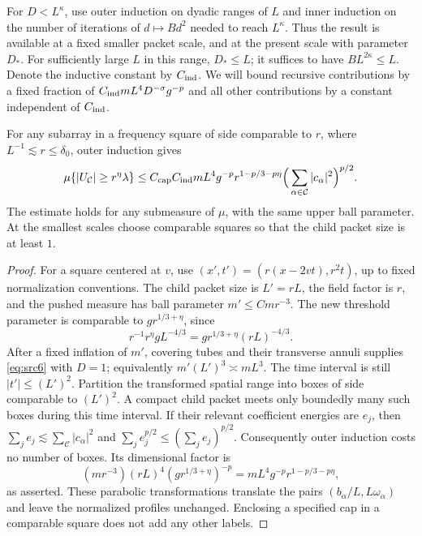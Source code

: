 For $D<L^\kappa$, use outer induction on dyadic ranges of $L$ and inner
induction on the number of iterations of $d\mapsto Bd^2$ needed to reach
$L^\kappa$.  Thus the result is available at a fixed smaller packet
scale, and at the present scale with parameter $D_*$.  For sufficiently
large $L$ in this range, $D_*\leq L$; it suffices to have
$BL^{2\kappa}\leq L$.  Denote the inductive constant by $C_{\rm ind}$.
We will bound recursive contributions by a fixed fraction of
$C_{\rm ind}mL^4D^{-\sigma}g^{-p}$ and all other contributions by a
constant independent of $C_{\rm ind}$.

\begin{lemma}\label{lem:dyadic-cap-gain}
For any subarray in a frequency square of side comparable to $r$, where
$L^{-1}\lesssim r\leq\delta_0$, outer induction gives
\begin{equation}\label{eq:dyadic-cap-gain}
 \mu\{|U_{\mathcal C}|\geq r^\eta\lambda\}
 \leq C_{\rm cap}C_{\rm ind}mL^4g^{-p}
 r^{1-p/3-p\eta}
 \Big(\sum_{\alpha\in\mathcal C}|c_\alpha|^2\Big)^{p/2}.
\end{equation}
The estimate holds for any submeasure of $\mu$, with the same upper ball
parameter.  At the smallest scales choose comparable squares so that
the child packet size is at least $1$.
\end{lemma}
\begin{proof}
For a square centered at $v$, use
$(x',t')=(r(x-2vt),r^2t)$, up to fixed normalization conventions.  The
child packet size is $L'=rL$, the field factor is $r$, and the pushed
measure has ball parameter $m'\leq Cm r^{-3}$.  The new threshold
parameter is comparable to $g r^{1/3+\eta}$, since
\[
 r^{-1}r^\eta gL^{-4/3}
   =g r^{1/3+\eta}(rL)^{-4/3}.
\]
After a fixed inflation of $m'$, covering tubes and their transverse
annuli supplies \eqref{eq:src6} with $D=1$; equivalently
$m'(L')^3\asymp mL^3$.  The time interval is still
$|t'|\leq(L')^2$.  Partition the transformed spatial range into boxes
of side comparable to $(L')^2$.  A compact child packet meets only
boundedly many such boxes during this time interval.  If their relevant
coefficient energies are $e_j$, then
$\sum_j e_j\lesssim\sum_{\mathcal C}|c_\alpha|^2$ and
$\sum_j e_j^{p/2}\leq(\sum_j e_j)^{p/2}$.  Consequently outer induction
costs no number of boxes.  Its dimensional factor is
\[
 (mr^{-3})(rL)^4(g r^{1/3+\eta})^{-p}
  =mL^4g^{-p}r^{1-p/3-p\eta},
\]
as asserted.  These parabolic transformations translate the pairs
$(b_\alpha/L,L\omega_\alpha)$ and leave the normalized profiles
unchanged.  Enclosing a specified cap in a comparable square does not
add any other labels.
\end{proof}


